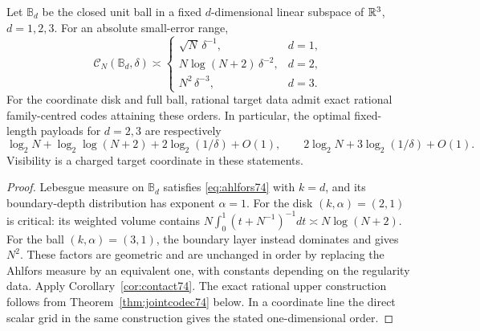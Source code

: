\begin{corollary}\label{cor:jointball74}
Let $\mathbb B_d$ be the closed unit ball in a fixed $d$-dimensional
linear subspace of $\mathbb R^3$, $d=1,2,3$. For an absolute small-error range,
\begin{equation}\label{eq:jointball74}
 \mathcal C_N(\mathbb B_d,\delta)\asymp
 \begin{cases}
 \sqrt N\,\delta^{-1},&d=1,\\
 N\log(N+2)\,\delta^{-2},&d=2,\\
 N^2\,\delta^{-3},&d=3.
 \end{cases}
\end{equation}
For the coordinate disk and full ball, rational target data admit exact
rational family-centred codes attaining these orders. In particular,
the optimal fixed-length payloads for $d=2,3$ are respectively
\[
 \log_2N+\log_2\log(N+2)+2\log_2(1/\delta)+O(1),
 \qquad 2\log_2N+3\log_2(1/\delta)+O(1).
\]
Visibility is a charged target coordinate in these statements.
\end{corollary}
\begin{proof}
Lebesgue measure on $\mathbb B_d$ satisfies \eqref{eq:ahlfors74} with
$k=d$, and its boundary-depth distribution has exponent $\alpha=1$.
For the disk $(k,\alpha)=(2,1)$ is critical: its weighted volume
contains $N\int_0^1(t+N^{-1})^{-1}dt\asymp N\log(N+2)$.
For the ball $(k,\alpha)=(3,1)$, the boundary layer instead
dominates and gives $N^2$. These factors are geometric and are
unchanged in order by replacing the Ahlfors measure by an equivalent
one, with constants depending on the regularity data.
Apply Corollary~\ref{cor:contact74}. The exact rational upper
construction follows from Theorem~\ref{thm:jointcodec74} below. In a
coordinate line the direct scalar grid in the same construction gives
the stated one-dimensional order.
\end{proof}


